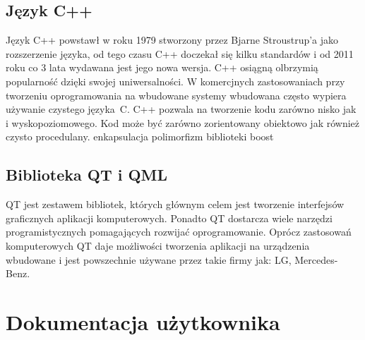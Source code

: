\documentclass[12pt, eng, twoside, openany, final]{mgr}
\begin{document}
    \section{Język C++}
    Język C++ powstawł w roku 1979 stworzony przez Bjarne Stroustrup'a jako rozszerzenie języka, od tego czasu C++ doczekał się kilku standardów i od 2011 roku co 3 lata wydawana jest jego nowa wersja. C++ osiągną olbrzymią popularność dzięki swojej uniwersalności. W komercjnych zastosowaniach przy tworzeniu oprogramowania na wbudowane systemy wbudowana często wypiera używanie czystego języka~C. C++ pozwala na tworzenie kodu zarówno nisko jak i wyskopoziomowego. Kod może być zarówno zorientowany obiektowo jak również czysto procedulany. 
    enkapsulacja
    polimorfizm
    biblioteki
    boost
    
    
    \newpage
    \section{Biblioteka QT i QML}
    QT jest zestawem bibliotek, których głównym celem jest tworzenie interfejsów graficznych aplikacji komputerowych. Ponadto QT dostarcza wiele narzędzi programistycznych pomagających rozwijać oprogramowanie. Oprócz zastosowań komputerowych QT daje możliwości tworzenia aplikacji na urządzenia wbudowane i jest powszechnie używane przez takie firmy jak: LG, Mercedes-Benz.
 
%
\chapter{Dokumentacja użytkownika}
\thispagestyle{fancy}
\end{document}
